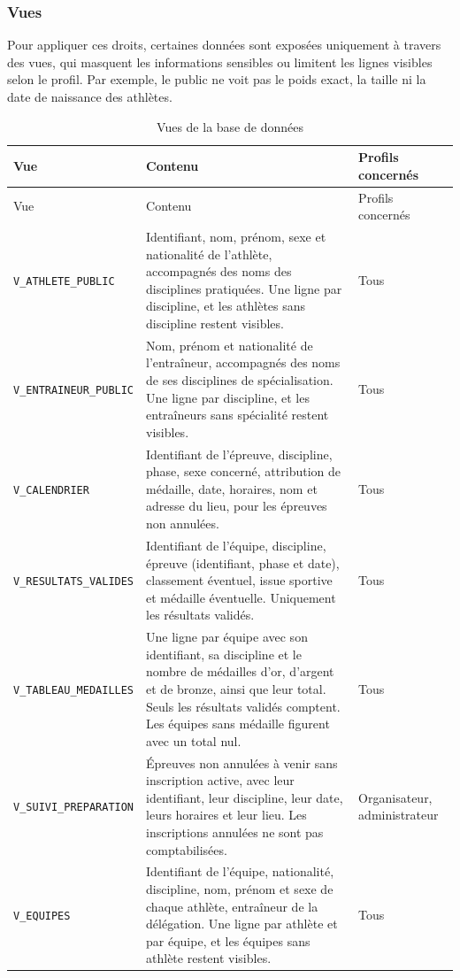 \clearpage
\subsubsection{Vues}

Pour appliquer ces droits, certaines données sont exposées uniquement à travers des vues, qui masquent les informations sensibles ou limitent les lignes visibles selon le profil. Par exemple, le public ne voit pas le poids exact, la taille ni la date de naissance des athlètes.

{\footnotesize
\renewcommand{\arraystretch}{1.3}
\begin{longtable}{|>{\raggedright\arraybackslash}p{4.1cm}|
                  >{\raggedright\arraybackslash}p{7.0cm}|
                  >{\centering\arraybackslash}p{3.0cm}|}
  \caption{Vues de la base de données}
  \label{tab:vues} \\
  \hline
  \rowcolor{gray!25}
  {Vue} & {Contenu} & {Profils concernés} \\
  \hline
  \endfirsthead
  \hline
  \rowcolor{gray!25}
  {Vue} & {Contenu} & {Profils concernés} \\
  \hline
  \endhead
  \hline
  \endfoot
  \texttt{\scriptsize V\_ATHLETE\_PUBLIC} & Identifiant, nom, prénom, sexe et nationalité de l'athlète, accompagnés des noms des disciplines pratiquées. Une ligne par discipline, et les athlètes sans discipline restent visibles. & Tous \\
  \hline
  \texttt{\scriptsize V\_ENTRAINEUR\_PUBLIC} & Nom, prénom et nationalité de l'entraîneur, accompagnés des noms de ses disciplines de spécialisation. Une ligne par discipline, et les entraîneurs sans spécialité restent visibles. & Tous \\
  \hline
  \texttt{\scriptsize V\_CALENDRIER} & Identifiant de l'épreuve, discipline, phase, sexe concerné, attribution de médaille, date, horaires, nom et adresse du lieu, pour les épreuves non annulées. & Tous \\
  \hline
  \texttt{\scriptsize V\_RESULTATS\_VALIDES} & Identifiant de l'équipe, discipline, épreuve (identifiant, phase et date), classement éventuel, issue sportive et médaille éventuelle. Uniquement les résultats validés. & Tous \\
  \hline
  \texttt{\scriptsize V\_TABLEAU\_MEDAILLES} & Une ligne par équipe avec son identifiant, sa discipline et le nombre de médailles d'or, d'argent et de bronze, ainsi que leur total. Seuls les résultats validés comptent. Les équipes sans médaille figurent avec un total nul. & Tous \\
  \hline
  \texttt{\scriptsize V\_SUIVI\_PREPARATION} & Épreuves non annulées à venir sans inscription active, avec leur identifiant, leur discipline, leur date, leurs horaires et leur lieu. Les inscriptions annulées ne sont pas comptabilisées. & Organisateur, administrateur \\
  \hline
  \texttt{\scriptsize V\_EQUIPES} & Identifiant de l'équipe, nationalité, discipline, nom, prénom et sexe de chaque athlète, entraîneur de la délégation. Une ligne par athlète et par équipe, et les équipes sans athlète restent visibles. & Tous \\
  \hline
\end{longtable}
}
